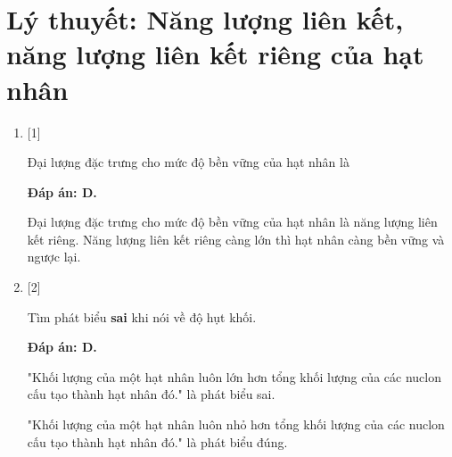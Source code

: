 \whiteBGstarBegin
\setcounter{section}{0}
\section{Lý thuyết: Năng lượng liên kết, năng lượng liên kết riêng của hạt nhân}
\begin{enumerate}[label=\bfseries Câu \arabic*:]
	\item {} [1]
	
	\cauhoi
	{Đại lượng đặc trưng cho mức độ bền vững của hạt nhân là
	}
	
	\loigiai
	{		\textbf{Đáp án: D.}
		
		Đại lượng đặc trưng cho mức độ bền vững của hạt nhân là năng lượng liên kết riêng. Năng lượng liên kết riêng càng lớn thì hạt nhân càng bền vững và ngược lại.
		
	}
		\item {} [2]
	
	\cauhoi
	{Tìm phát biểu \textbf{sai} khi nói về độ hụt khối.
	}
	
	\loigiai
	{		\textbf{Đáp án: D.}
		
		"Khối lượng của một hạt nhân luôn lớn hơn tổng khối lượng của các nuclon cấu tạo thành hạt nhân đó." là phát biểu sai.
		
		"Khối lượng của một hạt nhân luôn nhỏ hơn tổng khối lượng của các nuclon cấu tạo thành hạt nhân đó." là phát biểu đúng.
		
}
\end{enumerate}
